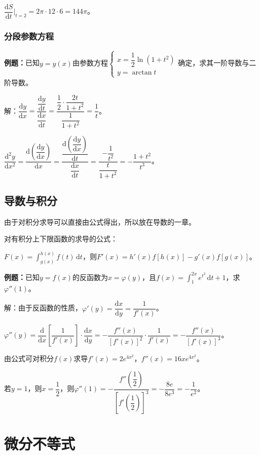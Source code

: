 $\dfrac{\textrm{d}S}{\textrm{d}t}\bigg|_{t=2}=2\pi\cdot12\cdot6=144\pi$。

\subsubsection{分段参数方程}

\textbf{例题：}已知$y=y(x)$由参数方程$\left\{\begin{array}{lcl}
    x=\dfrac{1}{2}\ln(1+t^2) \\
    y=\arctan t
\end{array}
\right.$确定，求其一阶导数与二阶导数。

解：$\dfrac{\textrm{d}y}{\textrm{d}x}=\dfrac{\dfrac{\textrm{d}y}{\textrm{d}t}}{\dfrac{\textrm{d}x}{\textrm{d}t}}=\dfrac{\dfrac{1}{2}\cdot\dfrac{2t}{1+t^2}}{\dfrac{1}{1+t^2}}=\dfrac{1}{t}$。

$\dfrac{\textrm{d}^2y}{\textrm{d}x^2}=\dfrac{\textrm{d}\left(\dfrac{\textrm{d}y}{\textrm{d}x}\right)}{\textrm{d}x}=\dfrac{\dfrac{\textrm{d}\left(\dfrac{\textrm{d}y}{\textrm{d}x}\right)}{\textrm{d}t}}{\dfrac{\textrm{d}x}{\textrm{d}t}}=\dfrac{-\dfrac{1}{t^2}}{\dfrac{t}{1+t^2}}=-\dfrac{1+t^2}{t^3}$。

\subsection{导数与积分}

由于对积分求导可以直接由公式得出，所以放在导数的一章。

对有积分上下限函数的求导的公式：

$F(x)=\int_{g(x)}^{h(x)}f(t)\,\textrm{d}t$，则$F'(x)=h'(x)f[h(x)]-g'(x)f[g(x)]$。

\textbf{例题：}已知$y=f(x)$的反函数为$x=\varphi(y)$，且$f(x)=\int_1^{2x}e^{t^2}\,\textrm{d}t+1$，求$\varphi''(1)$。

解：由于反函数的性质，$\varphi'(y)=\dfrac{\textrm{d}x}{\textrm{d}y}=\dfrac{1}{f'(x)}$。

$\varphi''(y)=\dfrac{\textrm{d}}{\textrm{d}x}\left[\dfrac{1}{f'(x)}\right]\cdot\dfrac{\textrm{d}x}{\textrm{d}y}=-\dfrac{f''(x)}{[f'(x)]^2}\cdot\dfrac{1}{f'(x)}=-\dfrac{f''(x)}{[f'(x)]^3}$。

由公式可对积分$f(x)$求导$f'(x)=2e^{4x^2}$，$f''(x)=16xe^{4x^2}$。

若$y=1$，则$x=\dfrac{1}{2}$，则$\varphi''(1)=-\dfrac{f''\left(\dfrac{1}{2}\right)}{\left[f'\left(\dfrac{1}{2}\right)\right]^3}=-\dfrac{8e}{8e^3}=-\dfrac{1}{e^2}$。

\section{微分不等式}

